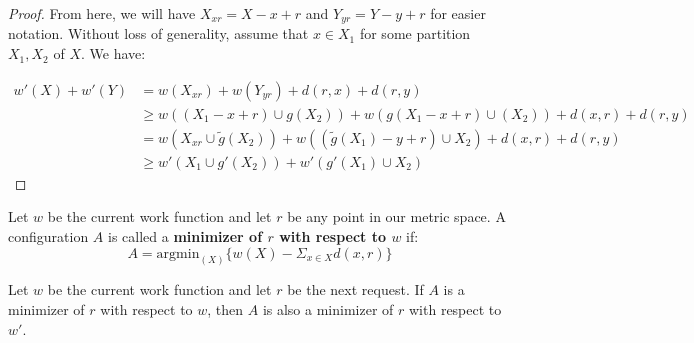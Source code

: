 \begin{proof}
    From here, we will have $X_{xr} = X - x + r$ and $Y_{yr} = Y - y + r$ for easier notation. Without loss of generality, assume that $x \in X_1$ for some partition $X_1, X_2$ of $X$. We have:

    \begin{equation*}
        \begin{split}
            w'(X) + w'(Y) &= w(X_{xr}) + w(Y_{yr}) + d(r, x) + d(r, y) \\
            &\geq w((X_1-x+r) \cup g(X_2)) + w(g(X_1-x+r) \cup (X_2)) + d(x, r) + d(r, y) \\
            &= w(X_{xr} \cup \tilde{g}(X_2)) + w((\tilde{g}(X_1) -y + r) \cup X_2) + d(x, r) + d(r, y) \\
            &\geq w'(X_1 \cup g'(X_2)) + w'(g'(X_1) \cup X_2) 
        \end{split}
    \end{equation*}
\end{proof}

\begin{definition}
    Let $w$ be the current work function and let $r$ be any point in our metric space. A configuration $A$ is called a \textbf{minimizer of $r$ with respect to $w$} if:
    \begin{equation*}
        A = \mathrm{argmin}_{(X)} \{ w(X) - \Sigma_{x \in X} d(x,r)\}
    \end{equation*}
\end{definition}

\begin{lemma}
    \label{lem:min}
    Let $w$ be the current work function and let $r$ be the next request. If $A$ is a minimizer of $r$ with respect to $w$, then $A$ is also a minimizer of $r$ with respect to $w'$.
\end{lemma}

